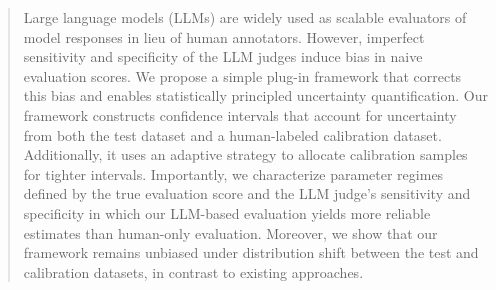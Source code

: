 \begin{abstract}
Large language models (LLMs) are widely used as scalable evaluators of model responses in lieu of human annotators. However, imperfect sensitivity and specificity of the LLM judges induce bias in naive evaluation scores. We propose a simple plug-in framework that corrects this bias and enables statistically principled uncertainty quantification. Our framework constructs confidence intervals that account for uncertainty from both the test dataset and a human-labeled calibration dataset. Additionally, it uses an adaptive strategy to allocate calibration samples for tighter intervals. Importantly, we characterize parameter regimes defined by the true evaluation score and the LLM judge’s sensitivity and specificity in which our LLM-based evaluation yields more reliable estimates than human-only evaluation. Moreover, we show that our framework remains unbiased under distribution shift between the test and calibration datasets, in contrast to existing approaches.
\end{abstract}
